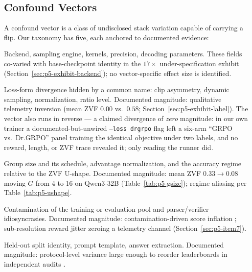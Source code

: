 \documentclass{article}  \usepackage[preprint,nonatbib]{neurips_2026} \usepackage[numbers]{natbib}
\providecommand{\tableref}[1]{Table~\ref{#1}}
\providecommand{\secref}[1]{Section~\ref{#1}}
\begin{document}
\subsection{Confound Vectors}
\label{sec:p5-vectors}
A confound vector is a class of undisclosed stack variation capable of
carrying a flip. Our taxonomy has five, each anchored to documented evidence:
\begin{description}[leftmargin=1.5em, itemsep=2pt, topsep=2pt]
\item[V1 --- Numerics and serving.] Backend, sampling engine, kernels,
precision, decoding parameters. These fields co-varied with base-checkpoint
identity in the $17\times$ under-specification exhibit
(\secref{sec:p5-exhibit-backend}); no vector-specific effect size is identified.
\item[V2 --- Objective semantics under a shared label.] Loss-form divergence
hidden by a common name: clip asymmetry, dynamic sampling, normalization,
ratio level. Documented magnitude: qualitative telemetry inversion (mean ZVF
$0.00$ vs.\ $0.58$; \secref{sec:p5-exhibit-label}). The vector also runs in
reverse --- a claimed divergence of \emph{zero} magnitude: in our own
trainer a documented-but-unwired \texttt{--loss drgrpo} flag left a six-arm
``GRPO vs.\ Dr.GRPO'' panel training the identical objective under two
labels, and no reward, length, or ZVF trace revealed it; only reading the
runner did.
\item[V3 --- Signal geometry.] Group size and its schedule, advantage
normalization, and the accuracy regime relative to the ZVF U-shape.
Documented magnitude: mean ZVF $0.33 \to 0.08$ moving $G$ from 4 to 16 on
Qwen3-32B (\tableref{tab:p5-gsize}); regime aliasing per
\tableref{tab:p5-ushape}.
\item[V4 --- Environment and data.] Contamination of the training or
evaluation pool and parser/verifier idiosyncrasies. Documented magnitude:
contamination-driven score inflation \citep{zhang2024gsm1k,
riddell2024contamination}; sub-resolution reward jitter zeroing a telemetry
channel (\secref{sec:p5-item7}).
\item[V5 --- Evaluation protocol.] Held-out split identity, prompt template,
answer extraction. Documented magnitude: protocol-level variance large enough
to reorder leaderboards in independent audits \citep{biderman2024lessons,
hochlehnert2025sober, zhang2024benchvariance}.
\end{description}
\end{document}
